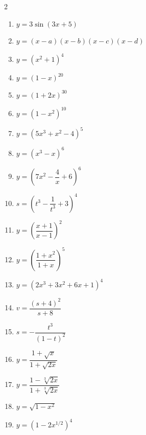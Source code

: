\begin{multicols}{2}
\begin{enumerate}
  \item $y = 3 \sin(3x + 5)$
  \item $y = (x - a)(x - b)(x - c)(x - d)$
  \item $y = (x^2 + 1)^4$
  \item $y = (1 - x)^{20}$
  \item $y = (1 + 2x)^{30}$
  \item $y = (1 - x^2)^{10}$
  \item $y = (5x^3 + x^2 - 4)^5$
  \item $y = (x^3 - x)^6$
  \item $y = \left(7x^2 - \dfrac{4}{x} + 6\right)^6$
  \item $s = \left(t^3 - \dfrac{1}{t^3} + 3\right)^4$
  \item $y = \left(\dfrac{x+1}{x-1}\right)^2$
  \item $y = \left(\dfrac{1 + x^2}{1 + x}\right)^5$
  \item $y = (2x^3 + 3x^2 + 6x + 1)^4$
  \item $v = \dfrac{(s + 4)^2}{s + 8}$
  \item $s = -\dfrac{t^3}{(1 - t)^2}$
  \item $y = \dfrac{1 + \sqrt{x}}{1 + \sqrt{2x}}$
  \item $y = \dfrac{1 - \sqrt[3]{2x}}{1 + \sqrt[3]{2x}}$
  \item $y = \sqrt{1 - x^2}$
  \item $y = \left(1 - 2x^{1/2}\right)^4$
\end{enumerate}
\end{multicols}
\newpage
